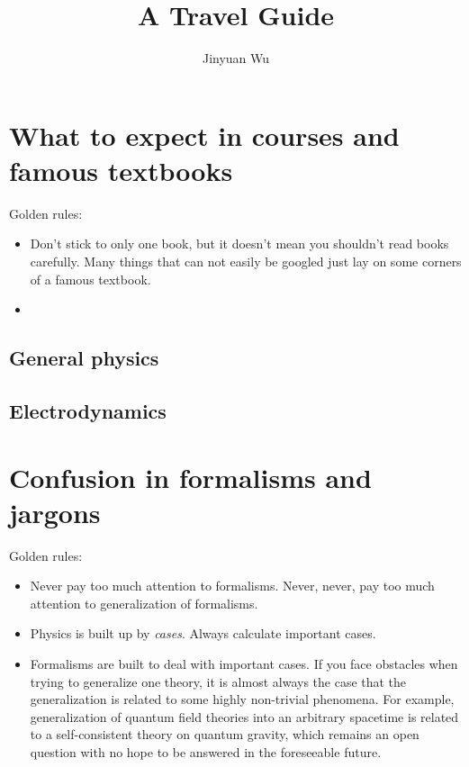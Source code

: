 \documentclass[hyperref, a4paper]{article}
\title{A Travel Guide}
\author{Jinyuan Wu}
\begin{document}
\maketitle

\section{What to expect in courses and famous textbooks}


Golden rules:
\begin{itemize}
    \item Don't stick to only one book, but it doesn't mean you shouldn't read books carefully. Many things that 
    can not easily be googled just lay on some corners of a famous textbook.
    \item 
\end{itemize}

\subsection{General physics}



\subsection{Electrodynamics}

\section{Confusion in formalisms and jargons}

Golden rules:
\begin{itemize}
    \item Never pay too much attention to formalisms. Never, never, pay too much attention to generalization of formalisms.
    \item Physics is built up by \emph{cases}. Always calculate important cases.
    \item Formalisms are built to deal with important cases. If you face obstacles when trying to generalize one theory, it is almost always the case that the generalization is related to some highly non-trivial phenomena.
    For example, generalization of quantum field theories into an arbitrary spacetime is related to a self-consistent theory on quantum gravity, which remains an open question with no hope to be answered in the foreseeable future.
\end{itemize}
\end{document}
